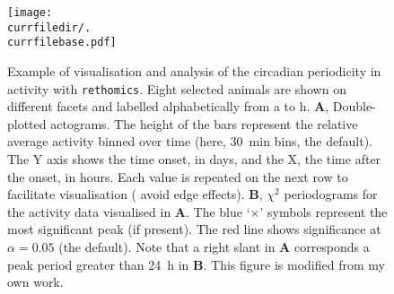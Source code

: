 \begin{figure}[h!]
	\centering   
	\texttt{[image: \\currfiledir/.\\currfilebase.pdf]}
	  \caption[Analysis of the periodicity in the activity in DAMs]{
	  	Example of visualisation and analysis of the circadian periodicity in \droso{} activity with \texttt{rethomics}.
	  	Eight selected animals are shown on different facets and labelled alphabetically from a to h.
\textbf{A}, Double-plotted actograms. 
	The height of the bars represent the relative average activity binned over time (here, 30~min bins, the default).
	The Y axis shows the time onset, in days, and the X, the time after the onset, in hours. 
	Each value is repeated on the next row to facilitate visualisation (\ie{} avoid edge effects).
\textbf{B}, $\chi^2$ periodograms for the activity data visualised in \textbf{A}.
	The blue `$\times$' symbols represent the most significant peak (if present).
	The red line shows significance at $\alpha = 0.05$ (the default).
	Note that a right slant in \textbf{A} corresponds a peak period greater than 24~h in \textbf{B}.
	This figure is modified from my own work\cite{geissmann_rethomics_2018}.
	\label{fig:\currfilebase}
}
\end{figure}
